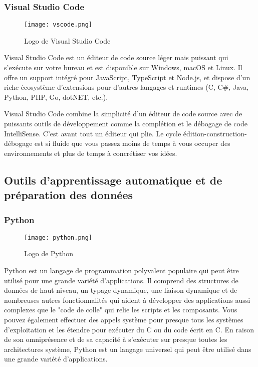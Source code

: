     \subsubsection{Visual Studio Code}
    \begin{figure}[H]
        \centering
        \texttt{[image: vscode.png]}
        \caption{Logo de Visual Studio Code}\label{fig:vscode}
    \end{figure}
    Visual Studio Code est un éditeur de code source léger mais puissant qui s'exécute sur votre bureau et est disponible sur Windows, macOS et Linux. Il offre un support intégré pour JavaScript, TypeScript et Node.js, et dispose d'un riche écosystème d'extensions pour d'autres langages et runtimes (C, C\#, Java, Python, PHP, Go, dotNET, etc.).

    Visual Studio Code combine la simplicité d'un éditeur de code source avec de puissants outils de développement comme la complétion et le débogage de code IntelliSense. 
 C'est avant tout un éditeur qui plie. Le cycle édition-construction-débogage est si fluide que vous passez moins de temps à vous occuper des environnements et plus de temps à concrétiser vos idées.

    \subsection{Outils d'apprentissage automatique et de préparation des données}
    \subsubsection{Python}
    \begin{figure}[H]
        \centering
        \texttt{[image: python.png]}
        \caption{Logo de Python}\label{fig:python}
    \end{figure}

    Python est un langage de programmation polyvalent populaire qui peut être utilisé pour une grande variété d'applications. Il comprend des structures de données de haut niveau, un typage dynamique, une liaison dynamique et de nombreuses autres fonctionnalités qui aident à développer des applications aussi  complexes que  le "code de colle" qui relie les scripts et les composants. Vous pouvez également  effectuer des appels système pour presque tous les systèmes d'exploitation et les étendre pour exécuter du C ou du code écrit en C. En raison de son omniprésence et de sa capacité à s'exécuter sur presque toutes les architectures système, Python est un langage universel qui peut être utilisé dans une grande variété d'applications.

